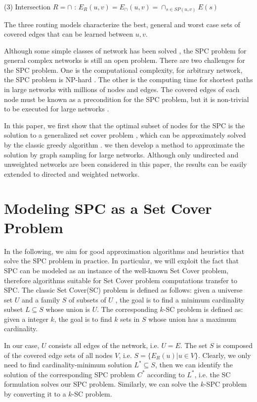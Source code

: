 \documentclass[review]{elsarticle}
\begin{document}
(3) Intersection $R=\cap$ :  $E_R(u,v)=E_{\cap}(u,v)=\cap_{s \in SP(u,v)}E(s)$

The three routing models characterize the best, general and worst case sets of covered edges that can be learned between $u,v$.

Although some simple classes of network has been solved \cite{Boothe, Pignolet}, the SPC problem for general complex networks is still an open problem. There are two challenges for the SPC problem. One is the computational complexity, for arbitrary network, the SPC problem is NP-hard \cite{Boothe}. The other is the computing time for shortest paths in large networks with millions of nodes and edges. The covered edges of each node must be known as a precondition for the SPC problem, but it is non-trivial to be executed for large networks \cite{Akiba}.

In this paper, we first show that the optimal subset of nodes for the SPC is the solution to a generalized set cover problem \cite{Karp}, which can be  approximately solved by the classic greedy algorithm \cite{Chvatal}. we then develop a method to approximate the solution by graph sampling for large networks. Although only undirected and unweighted networks are been considered in this paper, the results can be easily extended to directed and weighted networks.

\section{Modeling SPC as a Set Cover Problem}

In the following, we aim for good approximation algorithms and heuristics that solve the SPC problem in practice. In particular, we will exploit the fact that SPC can be modeled as an instance of the well-known Set Cover problem, therefore algorithms suitable for Set Cover problem computations transfer to SPC. The classic Set Cover(SC) problem is defined as follows: given a universe set $U$ and a family $S$ of subsets of $U$ , the goal is to find a minimum cardinality subset $L \subseteq S$ whose union is $U$. The corresponding $k$-SC problem is defined as: given a integer $k$, the goal is to find $k$ sets in $S$ whose union has a maximum cardinality.

In our case,  $U$ consists all edges of the network, i.e. $U=E$. The set $S$ is composed of the covered edge sets of all nodes $V$, i.e. $S=\{E_R(u)|u \in V\}$. Clearly, we only need to find cardinality-minimum solution $L^* \subseteq S$, then we can identify the solution of the corresponding SPC problem $C^*$ according to $L^*$, i.e. the SC formulation solves our SPC problem. Similarly, we can solve the $k$-SPC problem by converting it to a $k$-SC problem.
\end{document}
